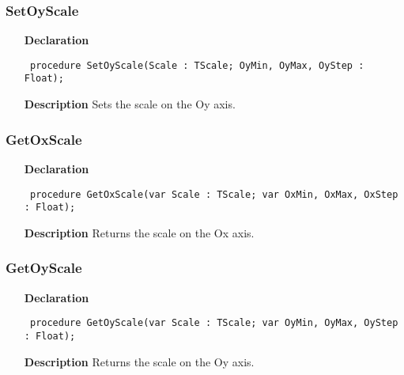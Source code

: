 \documentclass[12pt,a4paper,oneside]{report}
\newcommand{\declarationitem}[1]{\textbf{#1}}
\newcommand{\descriptiontitle}[1]{\textbf{#1}}
\newcommand{\code}[1]{\texttt{#1}}
\begin{document}
\subsubsection{SetOyScale}
\label{uplot-SetOyScale}
\begin{itemize}\item[\declarationitem{Declaration}\hfill]
	\begin{flushleft}
		\code{
			procedure SetOyScale(Scale : TScale; OyMin, OyMax, OyStep : Float);}
		
	\end{flushleft}
	
	\par
	\item[\descriptiontitle{Description}]
	Sets the scale on the Oy axis.
	
\end{itemize}
\subsubsection{GetOxScale}
\label{uplot-GetOxScale}
\begin{itemize}\item[\declarationitem{Declaration}\hfill]
	\begin{flushleft}
		\code{
			procedure GetOxScale(var Scale : TScale; var OxMin, OxMax, OxStep : Float);}
		
	\end{flushleft}
	
	\par
	\item[\descriptiontitle{Description}]
	Returns the scale on the Ox axis.
	
\end{itemize}
\subsubsection{GetOyScale}
\label{uplot-GetOyScale}
\begin{itemize}\item[\declarationitem{Declaration}\hfill]
	\begin{flushleft}
		\code{
			procedure GetOyScale(var Scale : TScale; var OyMin, OyMax, OyStep : Float);}
		
	\end{flushleft}
	
	\par
	\item[\descriptiontitle{Description}]
	Returns the scale on the Oy axis.
	
\end{itemize}
\end{document}
